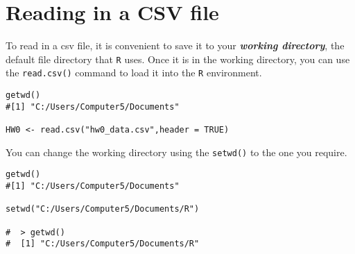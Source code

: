 \documentclass[a4paper,12pt]{article}
\begin{document}
 
\section{Reading in a CSV file}
To read in a csv file, it is convenient to save it to your \textit{\textbf{working directory}}, the default file directory that \texttt{R} uses. Once it is in the working directory, you can use the \texttt{read.csv()} command to load it into the \texttt{R} environment.
\begin{framed}
\begin{verbatim}
getwd()
#[1] "C:/Users/Computer5/Documents"

HW0 <- read.csv("hw0_data.csv",header = TRUE)
\end{verbatim}
\end{framed}
You can change the working directory using the \texttt{setwd()} to the one you require.
\begin{framed}
\begin{verbatim}
getwd()
#[1] "C:/Users/Computer5/Documents"

setwd("C:/Users/Computer5/Documents/R")

#  > getwd()
#  [1] "C:/Users/Computer5/Documents/R"
\end{verbatim}
\end{framed}
\end{document}
